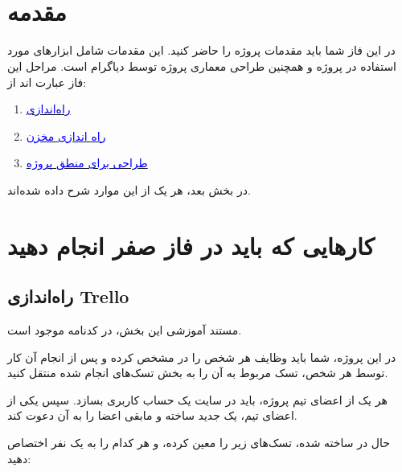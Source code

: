 \documentclass[]{article}
\begin{document}
\KashidaOff


 \Large \textbf{\\\\
}






\section* {{\titr مقدمه}}

در این فاز شما باید مقدمات پروژه را حاضر کنید. این مقدمات شامل ابزارهای مورد استفاده در پروژه و همچنین طراحی معماری پروژه توسط دیاگرام  است. مراحل این فاز عبارت اند از:

\begin{enumerate}
\item
\hyperref[subsec:trello]{\textcolor{blue}{راه‌اندازی }}

\item
\hyperref[subsec:github]{\textcolor{blue}{راه اندازی مخزن }}

\item
\hyperref[subsec:uml]{\textcolor{blue}{طراحی  برای منطق پروژه}}


\end{enumerate}

در بخش بعد، هر یک از این موارد شرح داده شده‌اند.

\newpage
\section*{{\titr کارهایی که باید در فاز صفر انجام دهید}}


\subsection*{{\titr راه‌اندازی Trello}}

\label{subsec:trello}

مستند آموزشی این بخش، در کدنامه موجود است.

در این پروژه، شما باید وظایف هر شخص را در   مشخص کرده و پس از انجام آن کار توسط هر شخص، تسک مربوط به آن را به بخش تسک‌های انجام شده منتقل کنید.

هر یک از اعضای تیم پروژه، باید در سایت
\href{https://trello.com/}{\textcolor{blue}{}}
  یک حساب کاربری بسازد. سپس یکی از اعضای تیم، یک  جدید ساخته و مابقی اعضا را به آن دعوت کند.

حال در  ساخته شده، تسک‌های زیر را معین کرده، و هر کدام را به یک نفر اختصاص دهید:
\end{document}
